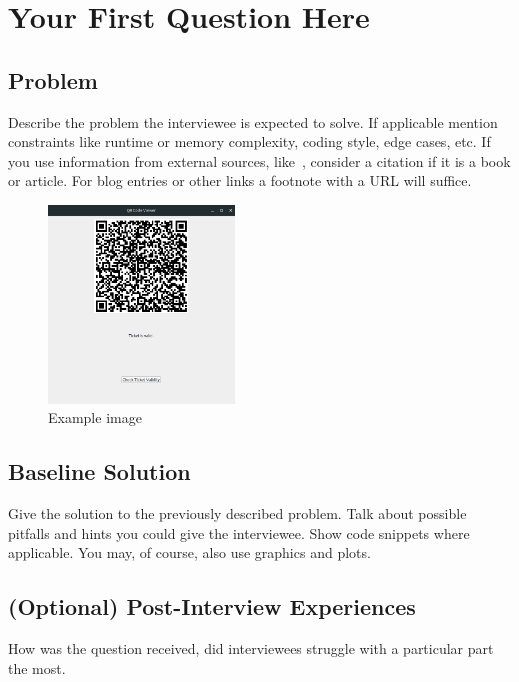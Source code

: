 \section{Your First Question Here}

\subsection{Problem}

Describe the problem the interviewee is expected to solve. If applicable
mention constraints like runtime or memory complexity, coding style, edge
cases, etc. If you use information from external sources,
like~\cite{McDowell_Cracking_2015}, consider a citation if it is a book or
article. For blog entries or other links a footnote with a URL will suffice.

\begin{figure}[h]
    \centering
    \includegraphics[width=0.44\textwidth]{../figures/QR_Window.png}
    \caption{Example image}
    \label{fig:screenshot}
\end{figure}


\subsection{Baseline Solution}

Give the solution to the previously described problem. Talk about possible
pitfalls and hints you could give the interviewee. Show code snippets where
applicable. You may, of course, also use graphics and plots.

\subsection{(Optional) Post-Interview Experiences}

How was the question received, did interviewees struggle with a particular part
the most.
